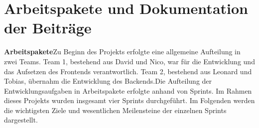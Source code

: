 \chapter{Arbeitspakete und Dokumentation der Beiträge}
\label{sec:chapter3}

\textbf{Arbeitspakete}\quad Zu Beginn des Projekts erfolgte eine allgemeine Aufteilung in zwei Teams. Team 1, bestehend aus David und Nico, war für die Entwicklung und das Aufsetzen des Frontends verantwortlich. Team 2, 
bestehend aus Leonard und Tobias, übernahm die Entwicklung des Backends.Die Aufteilung der Entwicklungsaufgaben in Arbeitspakete erfolgte anhand von Sprints. Im Rahmen dieses Projekts wurden insgesamt vier Sprints durchgeführt.
Im Folgenden werden die wichtigsten Ziele und wesentlichen Meilensteine der einzelnen Sprints dargestellt. 

